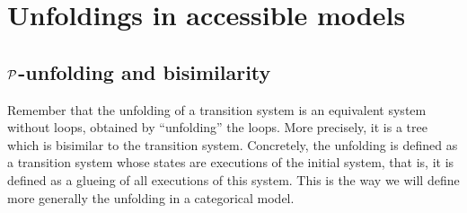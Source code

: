 








\section{Unfoldings in accessible models}
\label{unfold}






\subsection{$\mathcal{P}$-unfolding and bisimilarity}
\label{unfoldingandbisimilarity}


Remember that the unfolding of a transition system is an equivalent system without loops, obtained by ``unfolding'' the loops. More precisely, it is a tree which is bisimilar to the transition system. Concretely, the unfolding is defined as a transition system whose states are executions of the initial system, that is, it is defined as a glueing of all executions of this system. This is the way we will define more generally the unfolding in a categorical model.






